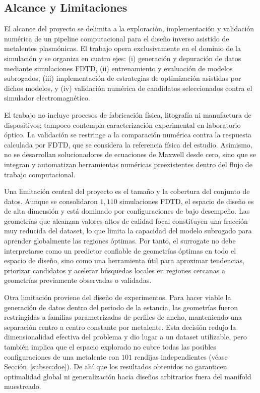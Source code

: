 \subsection{Alcance y Limitaciones}\label{subsec:alcance}

El alcance del proyecto se delimita a la exploración, implementación y validación numérica de un pipeline computacional para el diseño inverso asistido de metalentes plasmónicas. El trabajo opera exclusivamente en el dominio de la simulación y se organiza en cuatro ejes: (i) generación y depuración de datos mediante simulaciones FDTD, (ii) entrenamiento y evaluación de modelos subrogados, (iii) implementación de estrategias de optimización asistidas por dichos modelos, y (iv) validación numérica de candidatos seleccionados contra el simulador electromagnético.

El trabajo no incluye procesos de fabricación física, litografía ni manufactura de dispositivos; tampoco contempla caracterización experimental en laboratorio óptico. La validación se restringe a la comparación numérica contra la respuesta calculada por FDTD, que se considera la referencia física del estudio. Asimismo, no se desarrollan solucionadores de ecuaciones de Maxwell desde cero, sino que se integran y automatizan herramientas numéricas preexistentes dentro del flujo de trabajo computacional.

Una limitación central del proyecto es el tamaño y la cobertura del conjunto de datos. Aunque se consolidaron $1{,}110$ simulaciones FDTD, el espacio de diseño es de alta dimensión y está dominado por configuraciones de bajo desempeño. Las geometrías que alcanzan valores altos de calidad focal constituyen una fracción muy reducida del dataset, lo que limita la capacidad del modelo subrogado para aprender globalmente las regiones óptimas. Por tanto, el surrogate no debe interpretarse como un predictor confiable de geometrías óptimas en todo el espacio de diseño, sino como una herramienta útil para aproximar tendencias, priorizar candidatos y acelerar búsquedas locales en regiones cercanas a geometrías previamente observadas o validadas.

Otra limitación proviene del diseño de experimentos. Para hacer viable la generación de datos dentro del periodo de la estancia, las geometrías fueron restringidas a familias parametrizadas de perfiles de ancho, manteniendo una separación centro a centro constante por metalente. Esta decisión redujo la dimensionalidad efectiva del problema y dio lugar a un dataset utilizable, pero también implica que el espacio explorado no cubre todas las posibles configuraciones de una metalente con $101$ rendijas independientes (véase Sección~\ref{subsec:doe}). De ahí que los resultados obtenidos no garanticen optimalidad global ni generalización hacia diseños arbitrarios fuera del manifold muestreado.

